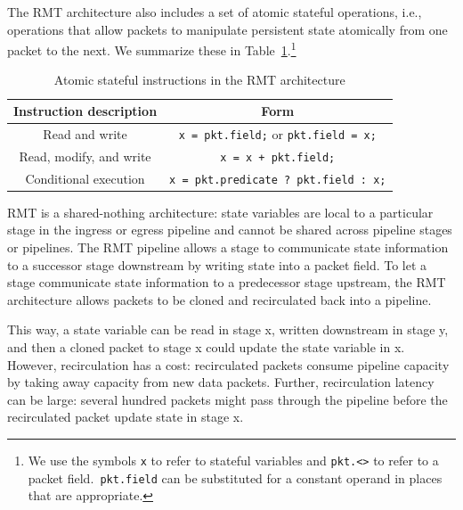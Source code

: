 The RMT architecture also includes a set of atomic stateful operations, i.e.,
operations that allow packets to manipulate persistent state atomically from
one packet to the next.  We summarize these in
Table~\ref{t:stateful_inst}.\footnote{We use the symbols {\tt x} to refer to
stateful variables and {\tt pkt.<>} to refer to a packet field.{\tt
pkt.field} can be substituted for a constant operand in places that are
appropriate.}
\begin{table}
\begin{small}
\begin{tabular}{|c|c|}
\hline
Instruction description & Form \\
\hline
Read and write & \texttt{x = pkt.field;} or \texttt{pkt.field = x;} \\
\hline
Read, modify, and write & \texttt{x = x + pkt.field;} \\
\hline
Conditional execution & \texttt{x = pkt.predicate ? pkt.field : x;} \\
\hline
\end{tabular}
\end{small}
\caption{Atomic stateful instructions in the RMT architecture}
\label{t:stateful_inst}
\end{table}

RMT is a shared-nothing architecture: state variables are local to a particular
stage in the ingress or egress pipeline and cannot be shared across pipeline
stages or pipelines. The RMT pipeline allows a stage to communicate state
information to a successor stage downstream by writing state into a packet
field. To let a stage communicate state information to a predecessor stage
upstream, the RMT architecture allows packets to be cloned and recirculated
back into a pipeline.

This way, a state variable can be read in stage x, written downstream in stage
y, and then a cloned packet to stage x could update the state variable in x.
However, recirculation has a cost: recirculated packets consume pipeline
capacity by taking away capacity from new data packets. Further, recirculation
latency can be large: several hundred packets might pass through the pipeline
before the recirculated packet update state in stage x.
